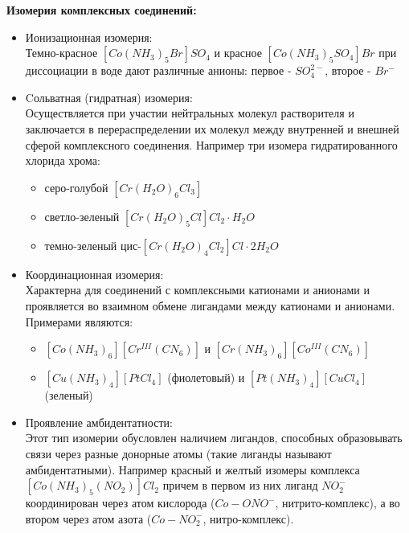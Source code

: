 \begin{flushleft}
	\begin{figure} [H]
	\centering {\texttt{[image: qq5]}}
\end{figure}
\end{flushleft}
\textbf{Изомерия комплексных соединений:} \\
\begin{itemize}
	\item Ионизационная изомерия: \\
	Темно-красное $\left[Co(NH_3)_5 Br \right]SO_4$ и красное $\left[Co(NH_3)_5SO_4 \right]Br$ при диссоциации в воде дают различные анионы: первое - $SO^{2-}_4$, второе - $Br^-$
	\item Cольватная (гидратная) изомерия: \\ 
	Осуществляется при участии нейтральных молекул растворителя и заключается в перераспределении их молекул между внутренней и внешней сферой комплексного соединения. Например три изомера гидратированного хлорида хрома:
	\begin{itemize}
		\item серо-голубой $\left[ Cr(H_2O)_6Cl_3  \right] $ 
		\item светло-зеленый $\left[ Cr(H_2O)_5Cl  \right]Cl_2 \cdot H_2O$ 
		\item темно-зеленый цис-$\left[ Cr(H_2O)_4Cl_2  \right]Cl \cdot 2H_2O$ 
	\end{itemize}
	\item Координационная изомерия: \\
	 Характерна для соединений с комплексными катионами и анионами и проявляется во взаимном обмене лигандами между катионами и анионами. \\
	 Примерами являются:
	 \begin{itemize}
	 	\item $\left[ Co(NH_3)_6  \right] \left[ Cr^{III}(CN_6)\right]$ и $\left[ Cr(NH_3)_6  \right] \left[ Co^{III}(CN_6)\right]$
	 	\item $\left[ Cu(NH_3)_4  \right] \left[ PtCl_4\right]$ (фиолетовый) и $\left[ Pt(NH_3)_4  \right] \left[ CuCl_4\right]$ (зеленый)
	 \end{itemize}
	\item Проявление амбидентатности: \\
	Этот тип изомерии обусловлен наличием лигандов, способных образовывать связи через разные донорные атомы (такие лиганды называют амбидентатными). Например красный и желтый изомеры комплекса $ \left[ Co(NH_3)_5(NO_2) \right]Cl_2 $ причем в первом из них лиганд $NO_2^-$ координирован через атом кислорода ($Co-ONO^-$, нитрито-комплекс), а во втором через атом азота ($Co-NO_2^-$, нитро-комплекс).

\end{itemize}
